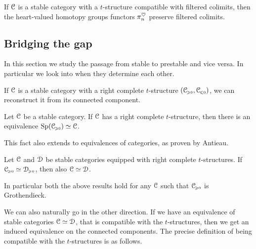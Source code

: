 \begin{remark}
    If $\EuScript{C}$ is a stable category with a $t$-structure compatible with filtered colimits, then the heart-valued homotopy groups functors $\pi_n^\heartsuit$ preserve filtered colimits. 
\end{remark}













\subsection{Bridging the gap}

In this section we study the passage from stable to prestable and vice versa. In particular we look into when they determine each other. 

If $\EuScript{C}$ is a stable category with a right complete $t$-structure $(\EuScript{C}_{\hspace{-1pt}\scriptscriptstyle\geqslant 0}, \EuScript{C}_{\hspace{-1pt}\scriptscriptstyle\leqslant 0})$, we can reconstruct it from its connected component. 

\begin{lemma}
    \label{ch3:lm:right-complete-then-equiv-to-sp}
    Let $\EuScript{C}$ be a stable category. If $\EuScript{C}$ has a right complete $t$-structure, then there is an equivalence $\mathrm{Sp}(\EuScript{C}_{\hspace{-1pt}\scriptscriptstyle\geqslant 0})\simeq \EuScript{C}$. 
\end{lemma}

This fact also extends to equivalences of categories, as proven by Antieau. 

\begin{lemma}
    \label{ch3:lm:if-prestable-equiv-then-stable-equiv}
    Let $\EuScript{C}$ and $\EuScript{D}$ be stable categories equipped with right complete $t$-structures. If $\EuScript{C}_{\hspace{-1pt}\scriptscriptstyle\geqslant 0}\simeq \EuScript{D}_{\hspace{-1pt}\scriptscriptstyle\geqslant 0}$, then also $\EuScript{C}\simeq \EuScript{D}$. 
\end{lemma}

\begin{remark}
    In particular both the above results hold for any $\EuScript{C}$ such that $\EuScript{C}_{\hspace{-1pt}\scriptscriptstyle\geqslant 0}$ is Grothendieck. 
\end{remark}

We can also naturally go in the other direction. If we have an equivalence of stable categories $\EuScript{C}\simeq \EuScript{D}$, that is compatible with the $t$-structures, then we get an induced equivalence on the connected components. The precise definition of being compatible with the $t$-structures is as follows. 

